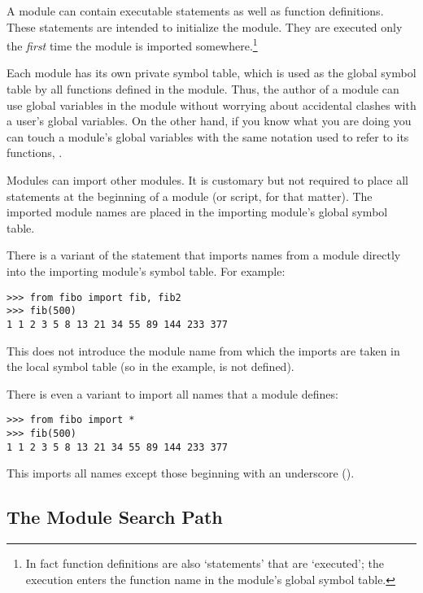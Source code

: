 \documentclass{manual}
\begin{document}
A module can contain executable statements as well as function
definitions.
These statements are intended to initialize the module.
They are executed only the
\emph{first} time the module is imported somewhere.\footnote{
        In fact function definitions are also `statements' that are
        `executed'; the execution enters the function name in the
        module's global symbol table.
}

Each module has its own private symbol table, which is used as the
global symbol table by all functions defined in the module.
Thus, the author of a module can use global variables in the module
without worrying about accidental clashes with a user's global
variables.
On the other hand, if you know what you are doing you can touch a
module's global variables with the same notation used to refer to its
functions,
.

Modules can import other modules.  It is customary but not required to
place all  statements at the beginning of a module (or
script, for that matter).  The imported module names are placed in the
importing module's global symbol table.

There is a variant of the  statement that imports
names from a module directly into the importing module's symbol
table.  For example:

\begin{verbatim}
>>> from fibo import fib, fib2
>>> fib(500)
1 1 2 3 5 8 13 21 34 55 89 144 233 377
\end{verbatim}

This does not introduce the module name from which the imports are taken
in the local symbol table (so in the example,  is not
defined).

There is even a variant to import all names that a module defines:

\begin{verbatim}
>>> from fibo import *
>>> fib(500)
1 1 2 3 5 8 13 21 34 55 89 144 233 377
\end{verbatim}

This imports all names except those beginning with an underscore
(\code{_}).

\subsection{The Module Search Path \label{searchPath}}

\end{document}
